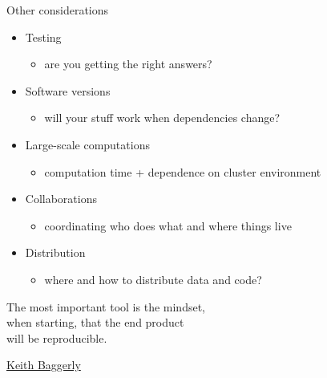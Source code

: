 \documentclass[aspectratio=169,12pt,t]{beamer}
\begin{document}
\begin{frame}[c]{Other considerations}

  \begin{itemize}
    \itemsep12pt
  \item Testing
    \begin{itemize}
    \item[] {\lolit are you getting the right answers?}
    \end{itemize}
  \item Software versions
    \begin{itemize}
    \item[] {\lolit will your stuff work when dependencies change?}
    \end{itemize}
  \item Large-scale computations
    \begin{itemize}
    \item[] {\lolit computation time + dependence on cluster environment}
    \end{itemize}
  \item Collaborations
    \begin{itemize}
    \item[] {\lolit coordinating who does what and where things live}
    \end{itemize}
  \item Distribution
    \begin{itemize}
    \item[] {\lolit where and how to distribute data and code?}
    \end{itemize}
  \end{itemize}


\end{frame}


\begin{frame}[c]{}

\begin{center}
\large
The most important tool is the {\hilit mindset},\\
when starting, that the end product \\
will be reproducible.
\end{center}

\hfill
{\lolit
{\textendash} \href{https://odin.mdacc.tmc.edu/~kabaggerly/}{Keith Baggerly}
}

\end{frame}
\end{document}

